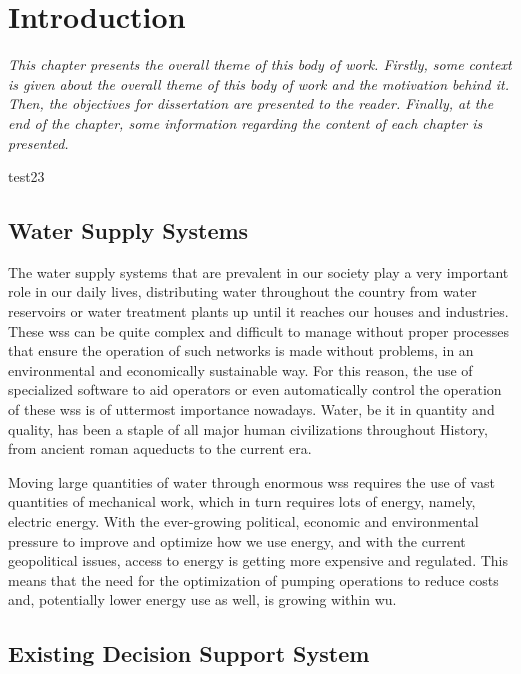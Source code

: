 \chapter{Introduction}
\label{intro}

\textit{This chapter presents the overall theme of this body of work. Firstly, some context is given about the overall theme of this body of work and the motivation behind it. Then, the objectives for dissertation are presented to the reader. Finally, at the end of the chapter, some information regarding the content of each chapter is presented.}

test23
\section{Water Supply Systems}
\label{intro:s:water-supply-systems}

The water supply systems that are prevalent in our society play a very important role in our daily lives, distributing water throughout the country from water reservoirs or water treatment plants up until it reaches our houses and industries. These \gls{wss} can be quite complex and difficult to manage without proper processes that ensure the operation of such networks is made without problems, in an environmental and economically sustainable way. For this reason, the use of specialized software to aid operators or even automatically control the operation of these \gls{wss} is of uttermost importance nowadays. Water, be it in quantity and quality, has been a staple of all major human civilizations throughout History, from ancient roman aqueducts to the current era. 

Moving large quantities of water through enormous \gls{wss} requires the use of vast quantities of mechanical work, which in turn requires lots of energy, namely, electric energy. With the ever-growing political, economic and environmental pressure to improve and optimize how we use energy, and with the current geopolitical issues, access to energy is getting more expensive and regulated. This means that the need for the optimization of pumping operations to reduce costs and, potentially lower energy use as well, is growing within \gls{wu}.

\section{Existing Decision Support System}
\label{intro:s:existing-decision-support-system}


